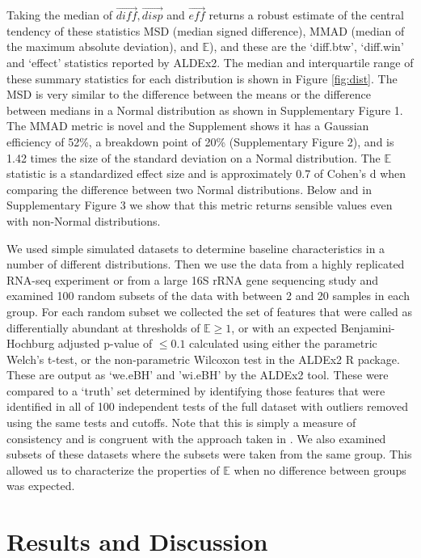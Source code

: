 \documentclass[fleqn,10pt,lineno]{wlpeerj}
\begin{document}
Taking the median of $\vec{\mathit{diff}}, \vec{\mathit{disp}}$ and $\vec{\mathit{eff}}$ returns a robust estimate of the central tendency of these statistics MSD (median signed difference), MMAD (median of the maximum absolute deviation), and $\mathbb{E}$), and these are the `diff.btw', `diff.win' and `effect' statistics reported by ALDEx2. The median and interquartile range of these summary statistics for each distribution is shown in Figure \ref{fig:dist}. The MSD is  very similar to the difference between the means or the difference between medians in a Normal distribution as shown in Supplementary Figure  1. The MMAD metric is novel and the Supplement shows it has a Gaussian efficiency of 52\%, a breakdown point of 20\% (Supplementary Figure 2), and is 1.42 times the size of the standard deviation on a Normal distribution. The $\mathbb{E}$ statistic is a standardized effect size and is approximately 0.7 of Cohen's d when comparing the difference between two Normal distributions.   Below and in Supplementary Figure 3 we show that this metric returns sensible values even with non-Normal distributions.


We used  simple simulated datasets to determine baseline characteristics in a number of different distributions. Then we use the data  from a highly replicated RNA-seq experiment \citep{Schurch:2016aa} or from a large 16S rRNA gene sequencing study  \citep{bian:2017} and examined 100 random subsets of the data with between 2 and 20 samples in each group. For each random subset we collected the set of features that were called as differentially abundant at thresholds of $\mathbb{E} \ge 1$, or with an expected Benjamini-Hochburg adjusted p-value of $\le 0.1$ calculated using either the parametric Welch's t-test, or the non-parametric Wilcoxon test in the ALDEx2 R package. These are output as `we.eBH' and 'wi.eBH' by the ALDEx2 tool. These were compared to a `truth' set determined by identifying those features that were identified in all of 100 independent tests of the full dataset with outliers removed using the same tests and cutoffs. Note that this is simply a measure of consistency and is congruent with the approach taken in \citep{Schurch:2016aa}. We also examined subsets of these datasets where the subsets were taken from the same group. This allowed us to characterize the properties of $\mathbb{E}$ when no difference between groups was expected.

\enlargethispage{6pt}


\section*{Results and Discussion}
\end{document}
